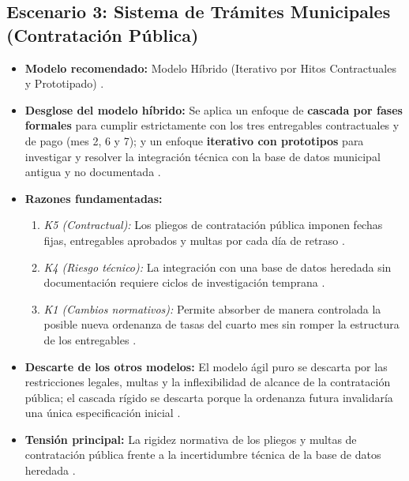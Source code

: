 \documentclass[12pt,a4paper]{article}
\begin{document}
\subsection{Escenario 3: Sistema de Trámites Municipales (Contratación Pública)}
\begin{itemize}
    \item \textbf{Modelo recomendado:} Modelo Híbrido (Iterativo por Hitos Contractuales y Prototipado) \cite{GA_Prac_01}.
    \item \textbf{Desglose del modelo híbrido:} Se aplica un enfoque de \textbf{cascada por fases formales} para cumplir estrictamente con los tres entregables contractuales y de pago (mes 2, 6 y 7); y un enfoque \textbf{iterativo con prototipos} para investigar y resolver la integración técnica con la base de datos municipal antigua y no documentada \cite{GA_Prac_01}.
    \item \textbf{Razones fundamentadas:}
        \begin{enumerate}
            \item \textit{K5 (Contractual):} Los pliegos de contratación pública imponen fechas fijas, entregables aprobados y multas por cada día de retraso \cite{GA_Prac_01}.
            \item \textit{K4 (Riesgo técnico):} La integración con una base de datos heredada sin documentación requiere ciclos de investigación temprana \cite{GA_Prac_01, Pohl2025}.
            \item \textit{K1 (Cambios normativos):} Permite absorber de manera controlada la posible nueva ordenanza de tasas del cuarto mes sin romper la estructura de los entregables \cite{GA_Prac_01}.
        \end{enumerate}
    \item \textbf{Descarte de los otros modelos:} El modelo ágil puro se descarta por las restricciones legales, multas y la inflexibilidad de alcance de la contratación pública; el cascada rígido se descarta porque la ordenanza futura invalidaría una única especificación inicial \cite{GA_Prac_01}.
    \item \textbf{Tensión principal:} La rigidez normativa de los pliegos y multas de contratación pública frente a la incertidumbre técnica de la base de datos heredada \cite{GA_Prac_01}.
\end{itemize}
\end{document}

